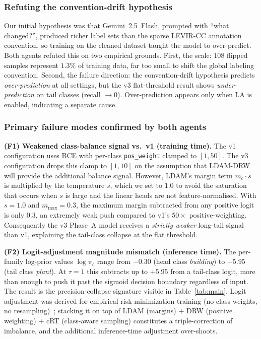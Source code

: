\documentclass[journal]{IEEEtran}
\begin{document}
\subsubsection*{Refuting the convention-drift hypothesis}
Our initial hypothesis was that Gemini~2.5~Flash, prompted with ``what changed?'', produced richer label sets than the sparse LEVIR-CC annotation convention, so training on the cleaned dataset taught the model to over-predict. Both agents refuted this on two empirical grounds. First, the scale: $108$ flipped samples represent $1.3\%$ of training data, far too small to shift the global labeling convention. Second, the failure direction: the convention-drift hypothesis predicts \emph{over-prediction} at all settings, but the v3 flat-threshold result shows \emph{under-prediction} on tail classes (recall $\to 0$). Over-prediction appears only when LA is enabled, indicating a separate cause.

\subsubsection*{Primary failure modes confirmed by both agents}
\textbf{(F1) Weakened class-balance signal vs.\ v1 (training time).} The v1 configuration uses BCE with per-class \texttt{pos\_weight} clamped to $[1, 50]$. The v3 configuration drops this clamp to $[1, 10]$ on the assumption that LDAM-DRW will provide the additional balance signal. However, LDAM's margin term $m_c \cdot s$ is multiplied by the temperature $s$, which we set to $1.0$ to avoid the saturation that occurs when $s$ is large and the linear heads are not feature-normalised. With $s = 1.0$ and $m_{\max} = 0.3$, the maximum margin subtracted from any positive logit is only $0.3$, an extremely weak push compared to v1's $50\times$ positive-weighting. Consequently the v3 Phase~A model receives a \emph{strictly weaker} long-tail signal than v1, explaining the tail-class collapse at the flat threshold.

\textbf{(F2) Logit-adjustment magnitude mismatch (inference time).} The per-family log-prior values $\log \pi_c$ range from $-0.30$ (head class \emph{building}) to $-5.95$ (tail class \emph{plant}). At $\tau = 1$ this subtracts up to $+5.95$ from a tail-class logit, more than enough to push it past the sigmoid decision boundary regardless of input. The result is the precision-collapse signature visible in Table~\ref{tab:main}. Logit adjustment was derived for empirical-risk-minimization training (no class weights, no resampling)~\cite{menon2021logitadjust}; stacking it on top of LDAM (margins) $+$ DRW (positive weighting) $+$ cRT (class-aware sampling) constitutes a triple-correction of imbalance, and the additional inference-time adjustment over-shoots.
\end{document}
